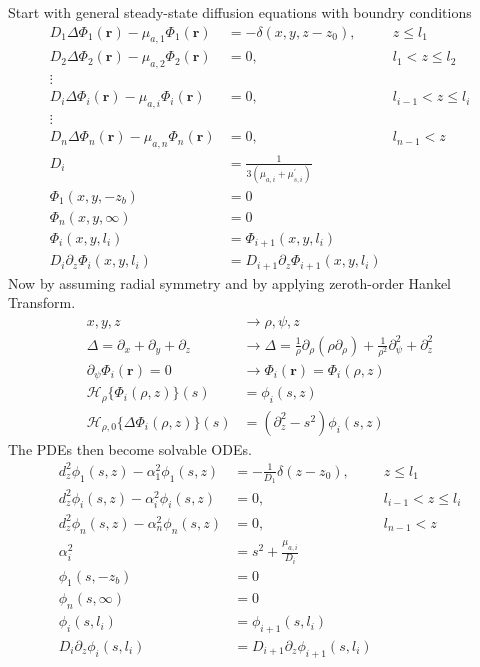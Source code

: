 \documentclass{article}
\begin{document}
Start with general steady-state diffusion equations with boundry conditions
\begin{align*}
D_1 \Delta \Phi_1(\mathbf{r}) - \mu_{a,1}\Phi_1(\mathbf{r}) &= -\delta(x, y, z - z_0), & z \le l_1 \\
D_2 \Delta \Phi_2(\mathbf{r}) - \mu_{a,2}\Phi_2(\mathbf{r}) &= 0, & l_1 < z \le l_2 \\
\vdots \\
D_i \Delta \Phi_i(\mathbf{r}) - \mu_{a,i}\Phi_i(\mathbf{r}) &= 0, & l_{i-1} < z \le l_i \\
\vdots \\
D_n \Delta \Phi_n(\mathbf{r}) - \mu_{a,n}\Phi_n(\mathbf{r}) &= 0, & l_{n-1} < z \\
D_i &= \frac{1}{3(\mu_{a,i} + \mu^{\prime}_{s,i})} \\
\Phi_1(x, y, -z_b) &= 0 \\
\Phi_n(x, y, \infty) &= 0 \\
\Phi_i(x, y, l_i) &= \Phi_{i+1}(x, y, l_i) \\
D_i \partial_z \Phi_i(x, y, l_i) &= D_{i+1} \partial_z \Phi_{i+1}(x, y, l_i)
\end{align*}
Now by assuming radial symmetry and by applying zeroth-order Hankel Transform.
\begin{align*}
x, y, z &\rightarrow \rho, \psi, z \\
\Delta = \partial_x + \partial_y + \partial_z &\rightarrow \Delta = \frac{1}{\rho}\partial_\rho(\rho \partial_\rho) 
 + \frac{1}{\rho^2}\partial^2_\psi + \partial^2_z \\
\partial_\psi \Phi_i(\mathbf{r}) = 0 &\rightarrow \Phi_i(\mathbf{r}) = \Phi_i(\rho, z) \\
\mathcal{H}_\rho\{{\Phi_i(\rho, z)}\}(s) &= \phi_i(s, z) \\
\mathcal{H}_{\rho, 0}\{{\Delta\Phi_i(\rho, z)}\}(s) &= (\partial^2_z - s^2)\phi_i(s, z)
\end{align*}
The PDEs then become solvable ODEs.
\begin{align*}
d^2_z\phi_1(s, z) - \alpha_1^2\phi_1(s, z) &= -\frac{1}{D_1}\delta(z - z_0), & z \le l_1 \\
d^2_z\phi_i(s, z) - \alpha_i^2\phi_i(s, z) &= 0, & l_{i-1} < z \le l_i \\
d^2_z\phi_n(s, z) - \alpha_n^2\phi_n(s, z) &= 0, & l_{n-1} < z \\
\alpha_i^2 &= s^2 + \frac{\mu_{a,i}}{D_i} \\
\phi_1(s, -z_b) &= 0 \\
\phi_n(s, \infty) &= 0 \\
\phi_i(s, l_i) &= \phi_{i+1}(s, l_i) \\
D_i \partial_z \phi_i(s, l_i) &= D_{i+1} \partial_z \phi_{i+1}(s, l_i)
\end{align*}
\end{document}
